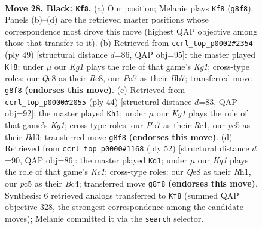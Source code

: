 \documentclass[11pt]{article}
\begin{document}
\clearpage

\begin{figure}[p]\centering
\begin{subfigure}{0.46\textwidth}\centering
\resizebox{\linewidth}{!}{%
\newchessgame
\chessboard[
  setfen={rn1rq1k1/pp4pQ/5p2/2P1P1B1/8/P5P1/1P3P2/1BR1R1K1 b - - 0 28},
  showmover=false,
  pgfstyle=straightmove, color=movearrow, markmove={g8-f8}
]}
\caption{}
\end{subfigure}\hfill
\begin{subfigure}{0.46\textwidth}\centering
\resizebox{\linewidth}{!}{%
\newchessgame
\chessboard[
  setfen={4r1k1/1brq1p1Q/4pp2/p7/Pp1P4/5P2/1PB3PP/2RR2K1 b - - 0 25},
  showmover=false,
  pgfstyle=straightmove, color=movearrow, markmove={g8-f8}
]}
\caption{}
\end{subfigure}
\\[4pt]
\begin{subfigure}{0.46\textwidth}\centering
\resizebox{\linewidth}{!}{%
\newchessgame
\chessboard[
  setfen={r1b2rk1/pp2b3/4p2p/3P4/4Q3/3B3P/P4qP1/3RR1K1 w - - 0 23},
  showmover=false,
  pgfstyle=straightmove, color=movearrow, markmove={g1-h1}
]}
\caption{}
\end{subfigure}\hfill
\begin{subfigure}{0.46\textwidth}\centering
\resizebox{\linewidth}{!}{%
\newchessgame
\chessboard[
  setfen={1r3rk1/pp3pb1/3p2R1/2p4Q/2B1P3/8/PqP5/2K4R w - - 0 27},
  showmover=false,
  pgfstyle=straightmove, color=movearrow, markmove={c1-d1}
]}
\caption{}
\end{subfigure}
\caption{\textbf{Move 28, Black: \texttt{Kf8}.} (a) Our position; Melanie plays \texttt{Kf8} (\texttt{g8f8}). Panels (b)--(d) are the retrieved master positions whose correspondence most drove this move (highest QAP objective among those that transfer to it). (b) Retrieved from \texttt{ccrl\_top\_p0002\#2354} (ply 49) [structural distance $d$=86, QAP obj=95]: the master played \texttt{Kf8}; under $\mu$ our \emph{Kg1} plays the role of that game's \emph{Kg1}; cross-type roles: our \emph{Q}e8 as their \emph{R}e8, our \emph{P}a7 as their \emph{B}b7; transferred move \texttt{g8f8} \textbf{(endorses this move)}. (c) Retrieved from \texttt{ccrl\_top\_p0000\#2055} (ply 44) [structural distance $d$=83, QAP obj=92]: the master played \texttt{Kh1}; under $\mu$ our \emph{Kg1} plays the role of that game's \emph{Kg1}; cross-type roles: our \emph{P}b7 as their \emph{R}e1, our \emph{p}c5 as their \emph{B}d3; transferred move \texttt{g8f8} \textbf{(endorses this move)}. (d) Retrieved from \texttt{ccrl\_top\_p0000\#1168} (ply 52) [structural distance $d$=90, QAP obj=86]: the master played \texttt{Kd1}; under $\mu$ our \emph{Kg1} plays the role of that game's \emph{Kc1}; cross-type roles: our \emph{Q}e8 as their \emph{R}h1, our \emph{p}c5 as their \emph{B}c4; transferred move \texttt{g8f8} \textbf{(endorses this move)}. Synthesis: 6 retrieved analogs transferred to \texttt{Kf8} (summed QAP objective 328, the strongest correspondence among the candidate moves); Melanie committed it via the \texttt{search} selector.}
\label{fig:thought-m55}
\end{figure}
\end{document}
